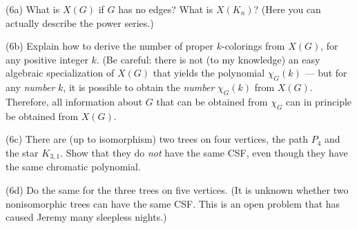 %
%

(6a) What is $X(G)$ if $G$ has no edges?  What is $X(K_n)$?  (Here you can actually describe the power series.)

(6b) Explain how to derive the number of proper $k$-colorings from $X(G)$, for any positive integer $k$.  (Be careful: there is not (to my knowledge) an easy algebraic specialization of $X(G)$ that yields the polynomial $\chi_G(k)$ --- but for any \emph{number} $k$, it is possible to obtain the \emph{number} $\chi_G(k)$ from $X(G)$.  Therefore, all information about $G$ that can be obtained from $\chi_G$ can in principle be obtained from $X(G)$.

(6c) There are (up to isomorphism) two trees on four vertices, the path $P_4$ and the star $K_{3,1}$.  Show that they do \emph{not} have the same CSF, even though they have the same chromatic polynomial.

(6d) Do the same for the three trees on five vertices.  (It is unknown whether two nonisomorphic trees can have the same CSF.  This is an open problem that has caused Jeremy many sleepless nights.)

